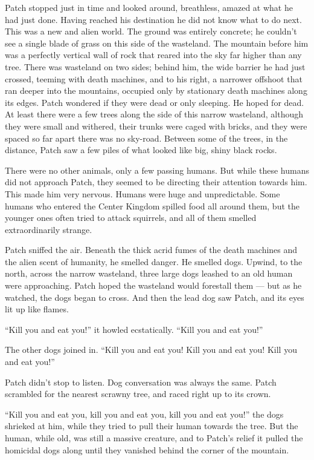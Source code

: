 \documentclass[ebook,oneside,openany,12pt]{memoir}
\begin{document}
Patch stopped just in time and looked around, breathless, amazed at
what he had just done. Having reached his destination he did not know
what to do next. This was a new and alien world. The ground was
entirely concrete; he couldn’t see a single blade of grass on this
side of the wasteland. The mountain before him was a perfectly
vertical wall of rock that reared into the sky far higher than any
tree. There was wasteland on two sides; behind him, the wide barrier
he had just crossed, teeming with death machines, and to his right, a
narrower offshoot that ran deeper into the mountains, occupied only by
stationary death machines along its edges. Patch wondered if they were
dead or only sleeping. He hoped for dead. At least there were a few
trees along the side of this narrow wasteland, although they were
small and withered, their trunks were caged with bricks, and they were
spaced so far apart there was no sky-road. Between some of the trees,
in the distance, Patch saw a few piles of what looked like big, shiny
black rocks.

There were no other animals, only a few passing humans. But while
these humans did not approach Patch, they seemed to be directing their
attention towards him. This made him very nervous. Humans were huge
and unpredictable. Some humans who entered the Center Kingdom spilled
food all around them, but the younger ones often tried to attack
squirrels, and all of them smelled extraordinarily strange.

Patch sniffed the air. Beneath the thick acrid fumes of the death
machines and the alien scent of humanity, he smelled danger. He
smelled dogs. Upwind, to the north, across the narrow wasteland, three
large dogs leashed to an old human were approaching. Patch hoped the
wasteland would forestall them — but as he watched, the dogs began to
cross. And then the lead dog saw Patch, and its eyes lit up like
flames.

“Kill you and eat you!” it howled ecstatically. “Kill you and eat
you!”

The other dogs joined in. “Kill you and eat you! Kill you and eat you!
Kill you and eat you!”

Patch didn’t stop to listen. Dog conversation was always the
same. Patch scrambled for the nearest scrawny tree, and raced right up
to its crown.

“Kill you and eat you, kill you and eat you, kill you and eat you!”
the dogs shrieked at him, while they tried to pull their human towards
the tree. But the human, while old, was still a massive creature, and
to Patch’s relief it pulled the homicidal dogs along until they
vanished behind the corner of the mountain.
\end{document}
